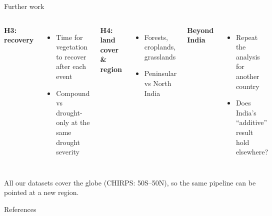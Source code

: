 \documentclass[11pt,aspectratio=169]{beamer}
\begin{document}
\begin{frame}{Further work}
  \begin{columns}[T]
    \textbf{H3: recovery}
    \begin{itemize}
      \item Time for vegetation to recover after each event
      \item Compound vs drought-only at the same drought severity
    \end{itemize}
    \textbf{H4: land cover \& region}
    \begin{itemize}
      \item Forests, croplands, grasslands
      \item Peninsular vs North India
    \end{itemize}
    \textbf{Beyond India}
    \begin{itemize}
      \item Repeat the analysis for another country
      \item Does India's ``additive'' result hold elsewhere?
    \end{itemize}
  \end{columns}

  \vspace{12pt}
  \footnotesize All our datasets cover the globe (CHIRPS: 50\textdegree S--50\textdegree N), so
  the same pipeline can be pointed at a new region.
\end{frame}

\begin{frame}[allowframebreaks]{References}
  \scriptsize
  
\end{frame}
\end{document}
